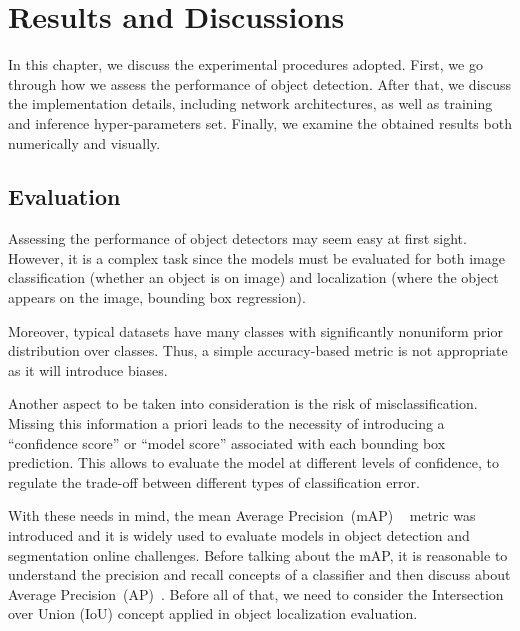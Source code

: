 \chapter{Results and Discussions}
\label{chap:results}
%
In this chapter, we discuss the experimental procedures adopted.
First, we go through how we assess the performance of object detection.
After that, we discuss the implementation details, including network architectures, as well as training and inference hyper-parameters set.
Finally, we examine the obtained results both numerically and visually.


\section{Evaluation}
\label{sec:eval}

Assessing the performance of object detectors may seem easy at first sight.
However, it is a complex task since the models must be evaluated for both image classification (whether an object is on image)  and localization (where the object appears on the image, \ie bounding box regression).

Moreover, typical datasets have many classes with significantly nonuniform prior distribution over classes.
Thus, a simple accuracy-based metric is not appropriate as it will introduce biases.

Another aspect to be taken into consideration is the risk of misclassification.
Missing this information a priori leads to the necessity of introducing a ``confidence score'' or ``model score'' associated with each bounding box prediction.
This allows to evaluate the model at different levels of confidence, \ie
to regulate the trade-off between different types of classification error.

With these needs in mind, the mean Average Precision~(mAP)
~\cite{Everingham10}
metric was introduced and it is widely used to evaluate models in object detection and segmentation online challenges.
Before talking about the mAP, it is reasonable to understand the precision and recall concepts of a classifier and then
discuss about  Average Precision~(AP)~\cite{Everingham10}.
%
%
Before all of that, we need to consider the Intersection over Union (IoU)  concept applied in object localization evaluation.


